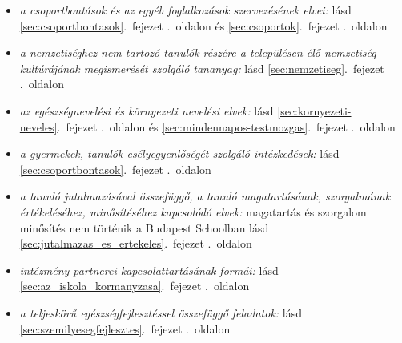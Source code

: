 \begin{itemize}
\item \emph{a csoportbontások és az egyéb foglalkozások szervezésének elvei: }    
       lásd        \ref{sec:csoportbontasok}.~fejezet .~oldalon és 
              \ref{sec:csoportok}.~fejezet .~oldalon
              
\item \emph{a nemzetiséghez nem tartozó tanulók részére a településen élő nemzetiség kultúrájának megismerését szolgáló tananyag: }    
       lásd        \ref{sec:nemzetiseg}.~fejezet .~oldalon
              
\item \emph{az egészségnevelési és környezeti nevelési elvek: }    
       lásd        \ref{sec:kornyezeti-neveles}.~fejezet .~oldalon és 
              \ref{sec:mindennapos-testmozgas}.~fejezet .~oldalon
              
\item \emph{a gyermekek, tanulók esélyegyenlőségét szolgáló intézkedések: }    
       lásd        \ref{sec:csoportbontasok}.~fejezet .~oldalon
              
\item \emph{a tanuló jutalmazásával összefüggő, a tanuló magatartásának, szorgalmának értékeléséhez, minősítéséhez kapcsolódó elvek: }   magatartás és szorgalom minősítés nem történik a Budapest Schoolban 
       lásd        \ref{sec:jutalmazas_es_ertekeles}.~fejezet .~oldalon
              
\item \emph{intézmény partnerei kapcsolattartásának formái: }    
       lásd        \ref{sec:az_iskola_kormanyzasa}.~fejezet .~oldalon
              
\item \emph{a teljeskörű egészségfejlesztéssel összefüggő feladatok: }    
       lásd        \ref{sec:szemilyesegfejlesztes}.~fejezet .~oldalon
              
\end{itemize}

